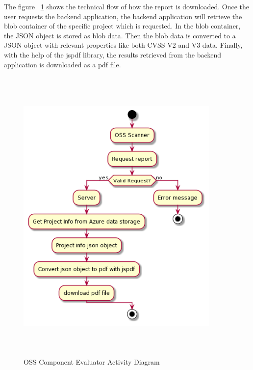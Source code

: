 The figure ~\ref{fig:Reporter_Activity_Diagram} shows the technical flow of how the report is downloaded. Once the user requests the backend application, the backend application will retrieve the blob container of the specific project which is requested. In the blob container, the JSON object is stored as blob data. Then the blob data is converted to a JSON object with relevant properties like both CVSS V2 and V3 data. Finally, with the help of the jspdf library, the results retrieved from the backend application is downloaded as a pdf file.  


%
\begin{figure}[h!]
	\includegraphics[width=10cm,height=15cm]{includes/Reporter_Activity_Diagram.png}
	\centering
	\caption{\acs{OSS} Component Evaluator Activity Diagram}
	\label{fig:Reporter_Activity_Diagram}
\end{figure}   